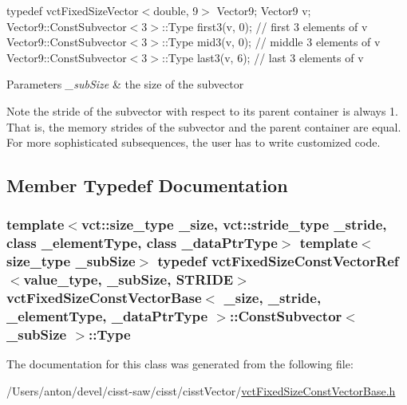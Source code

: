typedef vct\+Fixed\+Size\+Vector$<$double, 9$>$ Vector9; Vector9 v; Vector9\+::\+Const\+Subvector$<$3$>$\+::\+Type first3(v, 0); // first 3 elements of v Vector9\+::\+Const\+Subvector$<$3$>$\+::\+Type mid3(v, 0); // middle 3 elements of v Vector9\+::\+Const\+Subvector$<$3$>$\+::\+Type last3(v, 6); // last 3 elements of v


\begin{DoxyParams}{Parameters}
{\em \+\_\+sub\+Size} & the size of the subvector\\
\hline
\end{DoxyParams}
\begin{DoxyNote}{Note}
the stride of the subvector with respect to its parent container is always 1. That is, the memory strides of the subvector and the parent container are equal. For more sophisticated subsequences, the user has to write customized code. 
\end{DoxyNote}


\subsection{Member Typedef Documentation}
\hypertarget{classvct_fixed_size_const_vector_base_1_1_const_subvector_abe0d01ccc90fb2baf14abd8706c8de68}{}
\subsubsection[{Type}]{\setlength{\rightskip}{0pt plus 5cm}template$<$vct\+::size\+\_\+type \+\_\+size, vct\+::stride\+\_\+type \+\_\+stride, class \+\_\+element\+Type, class \+\_\+data\+Ptr\+Type$>$ template$<$size\+\_\+type \+\_\+sub\+Size$>$ typedef {\bf vct\+Fixed\+Size\+Const\+Vector\+Ref}$<$value\+\_\+type, \+\_\+sub\+Size, {\bf S\+T\+R\+I\+D\+E}$>$ {\bf vct\+Fixed\+Size\+Const\+Vector\+Base}$<$ \+\_\+size, \+\_\+stride, \+\_\+element\+Type, \+\_\+data\+Ptr\+Type $>$\+::{\bf Const\+Subvector}$<$ \+\_\+sub\+Size $>$\+::{\bf Type}}\label{classvct_fixed_size_const_vector_base_1_1_const_subvector_abe0d01ccc90fb2baf14abd8706c8de68}


The documentation for this class was generated from the following file\+:\begin{DoxyCompactItemize}
\item 
/\+Users/anton/devel/cisst-\/saw/cisst/cisst\+Vector/\hyperlink{vct_fixed_size_const_vector_base_8h}{vct\+Fixed\+Size\+Const\+Vector\+Base.\+h}\end{DoxyCompactItemize}
